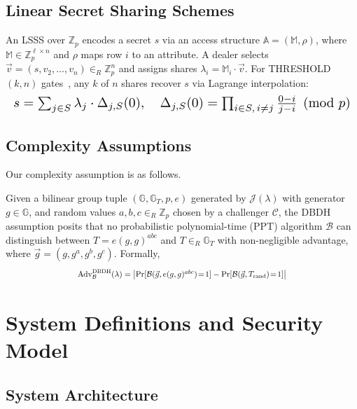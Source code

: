 ﻿\documentclass[lettersize,journal]{IEEEtran}
\begin{document}
\subsection{Linear Secret Sharing Schemes}
An LSSS over $\mathbb{Z}_p$ encodes a secret $s$ via an access structure
$\mathbb{A} = (\mathbb{M}, \rho)$, where $\mathbb{M} \in \mathbb{Z}_p^{\ell
\times n}$ and $\rho$ maps row $i$ to an attribute. A dealer selects
$\vec{v} = (s, v_2, \ldots, v_n) \in_R \mathbb{Z}_p^n$ and assigns shares
$\lambda_i = \mathbb{M}_i \cdot \vec{v}$. For THRESHOLD$(k,n)$
gates~\cite{Chattopadhyay2024}, any $k$ of $n$ shares recover $s$ via
Lagrange interpolation:
\begin{equation}
    \resizebox{\columnwidth}{!}{$
    s = \sum_{j \in S} \lambda_j \cdot \Delta_{j,S}(0), \quad
    \Delta_{j,S}(0) = \prod_{\substack{i \in S, \, i \neq j}}
    \frac{0 - i}{j - i} \pmod{p}
    $}
    \label{eq:lagrange}
\end{equation}

\subsection{Complexity Assumptions}
Our complexity assumption is as follows.

Given a bilinear group tuple $(\mathbb{G}, \mathbb{G}_T, p, e)$ generated
by $\mathcal{J}(\lambda)$ with generator $g \in \mathbb{G}$,
and random values $a, b, c \in_R \mathbb{Z}_p$
chosen by a challenger $\mathcal{C}$, the DBDH assumption posits that no
probabilistic polynomial-time (PPT) algorithm $\mathcal{B}$ can distinguish
between $T = e(g,g)^{abc}$ and $T \in_R \mathbb{G}_T$ with non-negligible
advantage, where $\vec{g} = (g, g^a, g^b, g^c)$. Formally,
\begin{equation}
\scalebox{0.82}{$
    \text{Adv}_{\mathcal{B}}^{\text{DBDH}}(\lambda)
    = \left|\Pr[\mathcal{B}(\vec{g},e(g,g)^{abc})\!=\!1]
    - \Pr[\mathcal{B}(\vec{g},T_{\text{rand}})\!=\!1]\right|
$}
    \label{eq:dbdh}
\end{equation}

\section{System Definitions and Security Model}
\label{sec:system}

\subsection{System Architecture}
\label{subsec:architecture}
\end{document}
